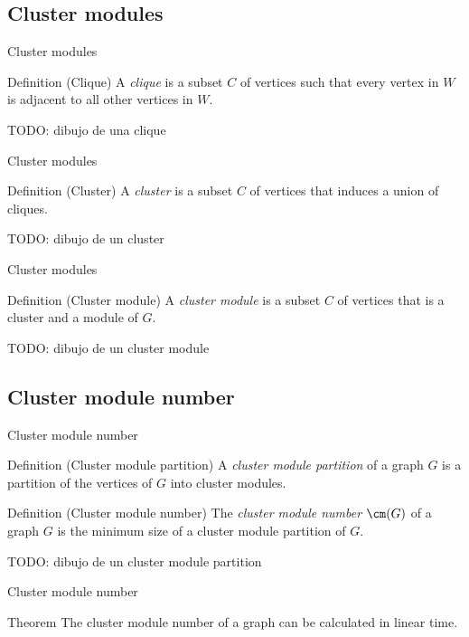 \documentclass{beamer}
\begin{document}
\subsection{Cluster modules}
\begin{frame}{Cluster modules}
    \begin{block}{Definition (Clique)}
        A \emph{clique} is a subset $C$ of vertices such that every vertex in $W$ is adjacent to all other vertices in $W$.
    \end{block}
    TODO: dibujo de una clique
\end{frame}


\begin{frame}{Cluster modules}
    \begin{block}{Definition (Cluster)}
        A \emph{cluster} is a subset $C$ of vertices that induces a union of cliques.
    \end{block}
    
    TODO: dibujo de un cluster
\end{frame}

\begin{frame}{Cluster modules}
    \begin{block}{Definition (Cluster module)}
        A \emph{cluster module} is a subset $C$ of vertices that is a cluster and a module of $G$.
    \end{block}

    TODO: dibujo de un cluster module
\end{frame}

\subsection{Cluster module number}
\begin{frame}{Cluster module number}
    \begin{block}{Definition (Cluster module partition)}
        A \emph{cluster module partition} of a graph $G$ is a partition of the vertices of $G$ into cluster modules.
    \end{block}

    \begin{block}{Definition (Cluster module number)}
        The \emph{cluster module number} $\cm(G)$ of a graph $G$ is the minimum size of a cluster module partition of $G$.
    \end{block}
    TODO: dibujo de un cluster module partition
\end{frame}

\begin{frame}{Cluster module number}
    \begin{block}{Theorem}
        The cluster module number of a graph can be calculated in linear time.
    \end{block}
\end{frame}
\end{document}
